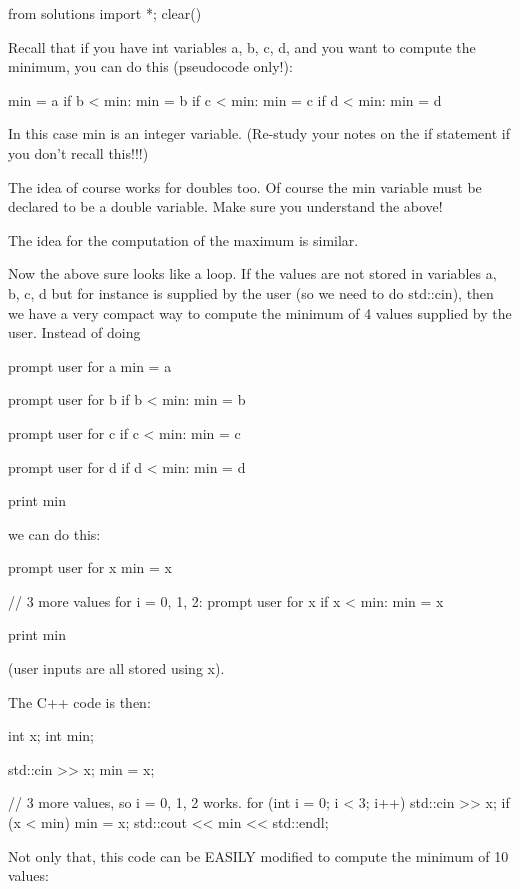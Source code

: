 \begin{python0}
from solutions import *; clear()
\end{python0}

Recall that if you have int variables a, b, c, d, and you want to
compute the minimum, you can do this (pseudocode only!):
\begin{console}
min = a
if b < min:
   min = b
if c < min:
   min = c
if d < min:
   min = d
\end{console}
In this case min is an integer variable. (Re-study your notes on the if
statement if you don't recall this!!!)

The idea of course works for doubles too. Of course the min variable
must be declared to be a double variable. Make sure you understand the
above!

The idea for the computation of the maximum is similar.

Now the above sure looks like a loop. If the values are not stored in
variables a, b, c, d but for instance is supplied by the user (so we
need to do std::cin), then we have a very compact way to compute the
minimum of 4 values supplied by the user. Instead of doing
\begin{console}
prompt user for a
min = a

prompt user for b
if b < min:
   min = b

prompt user for c
if c < min:
   min = c

prompt user for d
if d < min:
   min = d

print min
\end{console}
we can do this:

\begin{console}
prompt user for x
min = x

// 3 more values
for i = 0, 1, 2:
    prompt user for x
    if x < min:
       min = x
       
print min
\end{console}

(user inputs are all stored using x).

The C++ code is then:

\begin{console}
int x;
int min;

std::cin >> x;
min = x;

// 3 more values, so i = 0, 1, 2 works.
for (int i = 0; i < 3; i++)
{   
    std::cin >> x;
    if (x < min)
    {
        min = x;
    }
}
std::cout << min << std::endl; 
\end{console}
Not only that, this code can be EASILY modified to compute the minimum
of 10 values:

